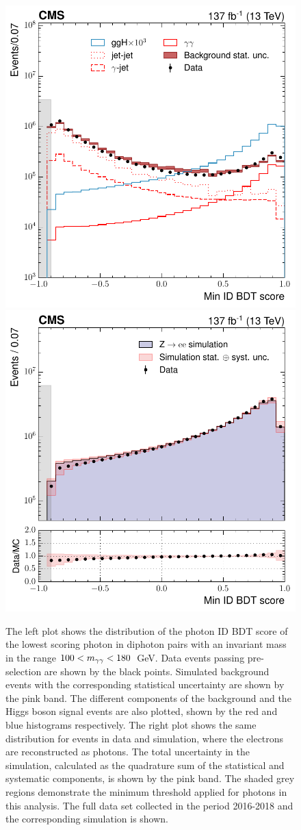 \begin{figure}[htb!]
  \centering
  \includegraphics[width=.49\textwidth]{Figures/hgg_overview/DiphoBDT_minIDMVA_logPlot.pdf}
  \includegraphics[width=.49\textwidth]{Figures/hgg_overview/DYValidation_DiphoBDT_RatioPlot_minIDMVA_logPlot.pdf}
  \caption[Photon ID output score distributions]
  {
    The left plot shows the distribution of the photon ID BDT score of the lowest scoring photon in diphoton pairs with an invariant mass in the range ${100<m_{\gamma\gamma}<180}$~GeV. Data events passing pre-selection are shown by the black points. Simulated background events with the corresponding statistical uncertainty are shown by the pink band. The different components of the background and the Higgs boson signal events are also plotted, shown by the red and blue histograms respectively. The right plot shows the same distribution for \Zee events in data and simulation, where the electrons are reconstructed as photons. The total uncertainty in the simulation, calculated as the quadrature sum of the statistical and systematic components, is shown by the pink band. The shaded grey regions demonstrate the minimum threshold applied for photons in this analysis. The full data set collected in the period 2016-2018 and the corresponding simulation is shown.
  }
  \label{fig:photon_id_1}
\end{figure}

